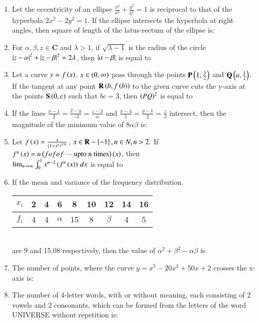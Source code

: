 \documentclass[journal]{IEEEtran}
\numberwithin{equation}{enumi}
\numberwithin{figure}{enumi}
\begin{document}
\begin{enumerate}[start=16]
    \item Let the eccentricity of an ellipse $\frac{x^2}{a^2}+\frac{y^2}{b^2}=1$ is reciprocal to that of the hyperbola $2x^2-2y^2=1$. If the ellipse intersects the hyperbola at right angles, then square of length of the latus-rectum of the ellipse is: \\

    \item For $\alpha,\beta,z\in\mathbf{C}$ and $\lambda>1$, if $\sqrt{\lambda-1}$ is the radius of the circle $\left\vert z-\alpha\right\vert^2+\left\vert z-\beta\right\vert^2=2\lambda$, then $\left\vert\alpha-\beta\right\vert$ is equal to\\

    \item Let a curve $y = f\left(x\right)$,  $x\in\left(0,\infty\right)$ pass through the points $\mathbf{P}\left(1,\frac{3}{2}\right)$ and $\mathbf{Q}\left(a,\frac{1}{2}\right)$. If the tangent at any point $\mathbf{R}\left(b,f\left(b\right)\right)$ to the given curve cuts the y-axis at the points $\mathbf{S}\left(0,c\right)$ such that $bc=3$, then $\left(PQ\right)^2$ is equal to\\

    \item If the lines $\frac{x-1}{2} = \frac{2 - y}{-3} = \frac{z - 3}{\alpha}$ and $\frac{x - 4}{5} = \frac{y - 1}{2} = \frac{z}{\beta}$ intersect, then the magnitude of the minimum value of $8 \alpha \beta$ is:\\

    \item Let $f\left(x\right)=\frac{x}{\left(1+x^{n}\right)^{1/n}}$, $x\in\mathbf{R}-\left\{-1\right\},n\in N,n>2.$ If $f^n\left(x\right)=n\left(fofof\cdots \text{upto n times}\right)\left(x\right)$, then\\
    $\lim_{n\to\infty}\int_{0}^{1} x^{n-2}\left(f^n\left(x\right)\right) \,dx$ is equal to\\

    \item If the mean and variance of the frequency distribution. \\
    \begin{tabular}{|c|c|c|c|c|c|c|c|c|} 
        \hline
            $x_i$ & 2 & 4 & 6 & 8 & 10 & 12 & 14 & 16 \\ 
        \hline
            $f_i$ & 4 & 4 & $\alpha$ & 15 & 8 & $\beta$ & 4 & 5 \\ 
        \hline
    \end{tabular}\\
    are 9 and 15.08 respectively, then the  value of $\alpha^2+\beta^2-\alpha\beta$ is\\

    \item The number of points, where the curve $y=x^{5}-20x^{3}+50x+2$ crosses the x-axis is:\\

    \item The number of 4-letter words, with or without meaning, each consisting of 2 vowels and 2 consonants, which can be formed from the letters of the word UNIVERSE without repetition is: \\


\end{enumerate}
\end{document}
